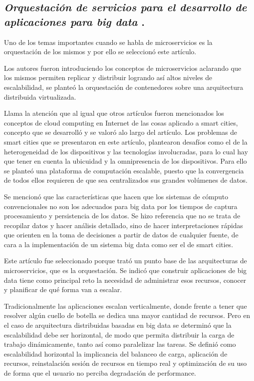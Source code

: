 \subsection{
    \textbf{\emph{Orquestación de servicios para el desarrollo de aplicaciones para big data}}
    \cite{orquestacion}.
}

Uno de los temas importantes cuando se habla de microservicios es la orquestación de los mismos y por ello se seleccionó este artículo.\par

Los autores fueron introduciendo los conceptos de microservicios aclarando que los mismos permiten replicar y distribuir logrando así altos niveles de escalabilidad, se planteó la orquestación de contenedores sobre una arquitectura distribuida virtualizada.\par

Llama la atención que al igual que otros artículos fueron mencionados los conceptos de cloud computing en Internet de las cosas aplicado a smart cities, concepto que se desarrolló y se valoró alo largo del artículo. Los problemas de smart cities que se presentaron en este artículo, plantearon desafíos como el de la heterogeneidad de los dispositivos y las tecnologías involucradas, para lo cual hay que tener en cuenta la ubicuidad y la omnipresencia de los dispositivos.
Para ello se planteó una plataforma de computación escalable, puesto que la convergencia de todos ellos requieren de que sea centralizados sus grandes  volúmenes de datos.\par

Se mencionó que las características que hacen que los sistemas de cómputo convencionales no son los adecuados para big data por los tiempos de captura procesamiento y persistencia de los datos. Se hizo referencia que no se trata de recopilar datos y hacer análisis detallado, sino de hacer interpretaciones rápidas que orienten en la toma de decisiones a partir de datos de cualquier fuente, de cara a la implementación de un sistema big data como ser el de smart cities.\par

Este artículo fue seleccionado porque trató un punto base de las arquitecturas de microservicios, que es la orquestación. Se indicó que construir aplicaciones de big data tiene como principal reto la necesidad de administrar esos recursos, conocer y planificar de qué forma van a escalar.\par

Tradicionalmente las aplicaciones escalan verticalmente, donde frente a tener que resolver algún cuello de botella se dedica una mayor cantidad de recursos.
Pero en el caso de arquitectura distribuidas basadas en big data se determinó que la escalabilidad debe ser horizontal, de modo que permita distribuir la carga de trabajo dinámicamente, tanto así como paralelizar las tareas.
Se definió como escalabilidad horizontal la implicancia del balanceo de carga, aplicación de recursos, reinstalación sesión de recursos en tiempo real y optimización de su uso de forma que el usuario no perciba degradación de performance.\par


